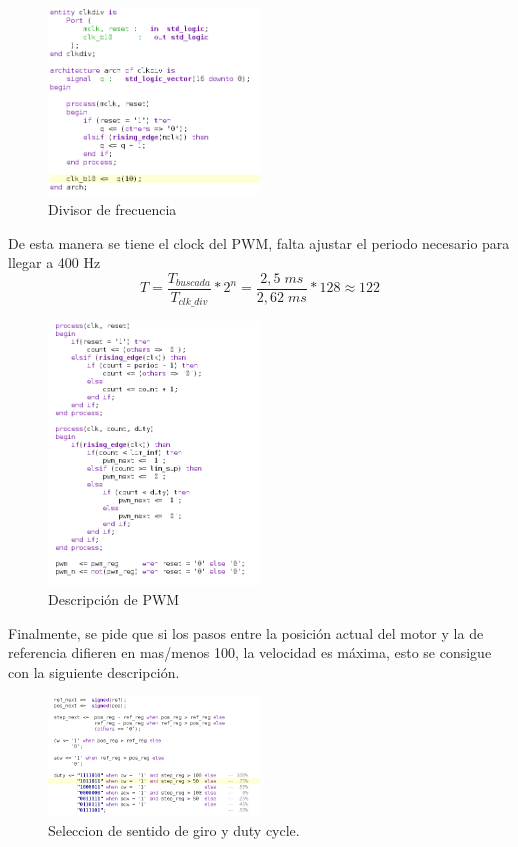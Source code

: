 \documentclass[11pt, a4paper]{article}
\begin{document}
		\begin{figure}[H]
			\centering
			\includegraphics[width=0.5\textwidth]{Imagenes/clk_div.png}
			\caption{Divisor de frecuencia}
			\label{fig:clk_div}
		\end{figure} 

		De esta manera se tiene el clock del PWM, falta ajustar el periodo necesario para llegar a 400 Hz
			\begin{equation}
				T = \frac{T_{buscada}}{T_{clk\_div}} * 2^n = \frac{2,5 \; ms}{2,62 \; ms} * 128 \approx 122 
			\end{equation}

		\begin{figure}[H]
			\centering
			\includegraphics[width=0.5\textwidth]{Imagenes/pwm_400.png}
			\caption{Descripción de PWM}
			\label{fig:pwm_400}
		\end{figure} 

		Finalmente, se pide que si los pasos entre la posición actual del motor y la de referencia difieren en mas/menos 100, la velocidad es máxima, esto se consigue con la siguiente descripción.

		\begin{figure}[H]
			\centering
			\includegraphics[width=0.5\textwidth]{Imagenes/func_pwm.png}
			\caption{Seleccion de sentido de giro y duty cycle.}
			\label{fig:func_pwm}
		\end{figure} 
\end{document}
